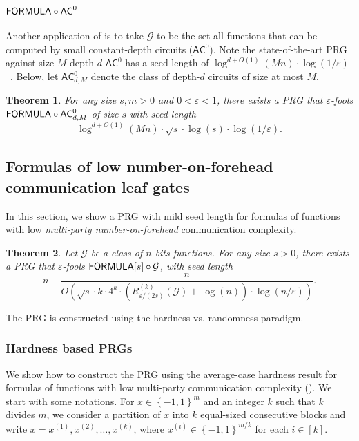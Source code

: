 \documentclass[10pt,a4paper]{article}
\newtheorem{theorem}{Theorem}
\newcommand{\boolpm}{\left\{-1,1\right\}}
\newcommand{\FORMULA}{{\sf FORMULA}}
\newcommand{\AC}{\mathsf{AC}}
\begin{document}
%
%
%
%
%
%
%
%
%
%
    \subsubsection{\texorpdfstring{$\FORMULA\circ\AC^0$}{FORMULA-AC0}}

	Another application of  is to take $\mathcal{G}$ to be the set all functions that can be computed by small constant-depth circuits ($\AC^0$). Note the state-of-the-art PRG against size-$M$ depth-$d$ $\AC^0$ has a seed length of $\log^{d+O(1)}(Mn)\cdot\log(1/\varepsilon)$~\cite{ST19}. Below, let $\AC^0_{d,M}$ denote the class of depth-$d$ circuits of size at most $M$.
	
	\setcounter{theorem}{34}
\begin{theorem}\label{thm:prg-formula-ac0}
		For any size $s,m>0$ and $0<\varepsilon<1$, there exists a PRG that $\varepsilon$-fools $\FORMULA\circ \AC^0_{d,M}$ of size $s$ with seed length
		\[
			\log^{d+O(1)}(Mn)\cdot\sqrt{s}\cdot\log(s)\cdot\log(1/\varepsilon).
		\]
	\end{theorem}
	
%
%
%
%
%
%
%
%
%
	\subsection{Formulas of low number-on-forehead communication leaf gates}
	
	In this section, we show a PRG with mild seed length for formulas of functions with low \emph{multi-party number-on-forehead} communication complexity.
	
	\setcounter{theorem}{36}
\begin{theorem}\label{thm:mild-prg}
	    Let $\mathcal{G}$ be a class of $n$-bits functions. For any size $s>0$, there exists a PRG that $\varepsilon$-fools $\FORMULA[s]\circ \mathcal{G}$, with seed length
		\[
		    n-\frac{n}{O\left(\sqrt{s}\cdot k\cdot4^k\cdot \left( R^{(k)}_{\varepsilon/(2s)}(\mathcal{G})+\log(n)\right)\cdot\log(n/\varepsilon)\right)}.
		\]
	\end{theorem}
	
	The PRG is constructed using the hardness vs. randomness paradigm.
	    
	\subsubsection{Hardness based PRGs}
	
	We show how to construct the PRG using the average-case hardness result for formulas of functions with low multi-party communication complexity (). We start with some notations. For $x\in\boolpm^m$ and an integer $k$ such that $k$ divides $m$, we consider a partition of $x$ into $k$ equal-sized consecutive blocks and write $x=x^{(1)},x^{(2)},\dots,x^{(k)}$, where $x^{(i)}\in\boolpm^{m/k}$ for each $i\in [k]$.
    	
\end{document}
